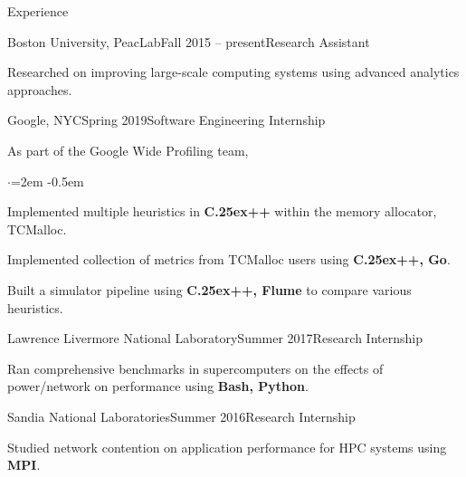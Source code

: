 \documentclass{resume}
\def\bfCplusplus{{\rm{\bf C\raise.25ex\hbox{\small ++}}}}
\begin{document}
\begin{rSection}{Experience}

\begin{rWorksection}{Boston University, PeacLab}{Fall 2015 -- present}{Research Assistant}
\item Researched on improving large-scale computing systems using advanced
  analytics approaches.
\end{rWorksection}

\begin{rWorksection}{Google, NYC}{Spring 2019}{Software Engineering
    Internship}
\item As part of the Google Wide Profiling team,
  \begin{list}{$\cdot$}{\leftmargin=2em} %
    \itemsep -0.5em \vspace{-0.5em} %
  \item Implemented multiple heuristics in {\bf \bfCplusplus{}} within the memory
    allocator, TCMalloc.
  \item Implemented collection of metrics from TCMalloc users using {\bf
      \bfCplusplus{}, Go}.
  \item Built a simulator pipeline using {\bf \bfCplusplus{}, Flume} to compare
    various heuristics.
  \end{list}
\end{rWorksection}

\begin{rWorksection}{Lawrence Livermore National Laboratory}{Summer
    2017}{Research Internship}
\item Ran comprehensive benchmarks in supercomputers on the effects of
  power/network on performance using {\bf Bash, Python}.
\end{rWorksection}

\begin{rWorksection}{Sandia National Laboratories}{Summer 2016}{Research
    Internship}
\item Studied network contention on application performance for HPC systems
  using {\bf MPI}.
\end{rWorksection}

\end{rSection}
\end{document}

